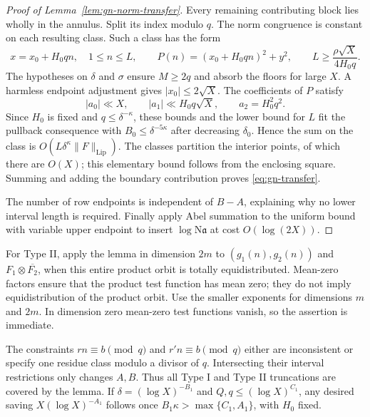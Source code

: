 \begin{proof}[Proof of Lemma~\ref{lem:gn-norm-transfer}]
Every remaining contributing block lies wholly in the annulus. Split
its index modulo $q$. The norm congruence is constant on each resulting
class. Such a class has the form
\[
 x=x_0+H_0qn,\quad 1\leq n\leq L,\qquad
 P(n)=(x_0+H_0qn)^2+y^2,
 \qquad L\geq\frac{\rho\sqrt X}{4H_0q}.
\]
The hypotheses on $\delta$ and $\sigma$ ensure $M\geq2q$ and absorb
the floors for large $X$. A harmless endpoint adjustment gives
$|x_0|\leq2\sqrt X$. The coefficients of $P$ satisfy
\[
 |a_0|\ll X,\qquad |a_1|\ll H_0q\sqrt X,\qquad a_2=H_0^2q^2.
\]
Since $H_0$ is fixed and $q\leq\delta^{-\kappa}$, these bounds and the
lower bound for $L$ fit the pullback consequence with
$B_0\leq\delta^{-5\kappa}$ after decreasing $\delta_0$.
Hence the sum on the class is
$O(L\delta^\kappa\|F\|_{\mathrm{Lip}})$. The classes partition the
interior points, of which there are $O(X)$; this elementary bound follows
from the enclosing square. Summing and adding the boundary contribution
proves \eqref{eq:gn-transfer}.

The number of row endpoints is independent of $B-A$, explaining why no
lower interval length is required. Finally apply Abel summation to the
uniform bound with variable upper endpoint to insert $\log\mathrm N
\mathfrak a$ at cost $O(\log(2X))$.
\end{proof}

\begin{remark}\label{rem:gn-product-and-progression}
For Type II, apply the lemma in dimension $2m$ to
$(g_1(n),g_2(n))$ and $F_1\otimes\overline{F_2}$, when this entire
product orbit is totally equidistributed. Mean-zero factors ensure that
the product test function has mean zero; they do not imply
equidistribution of the product orbit. Use the smaller exponents for
dimensions $m$ and $2m$. In dimension zero mean-zero test functions
vanish, so the assertion is immediate.

The constraints $rn\equiv b\pmod q$ and $r'n\equiv b\pmod q$ either
are inconsistent or specify one residue class modulo a divisor of $q$.
Intersecting their interval restrictions only changes $A,B$. Thus all
Type I and Type II truncations are covered by the lemma. If
$\delta=(\log X)^{-B_1}$ and $Q,q\leq(\log X)^{C_1}$, any desired
saving $X(\log X)^{-A_1}$ follows once
$B_1\kappa>\max\{C_1,A_1\}$, with $H_0$ fixed.
\end{remark}


